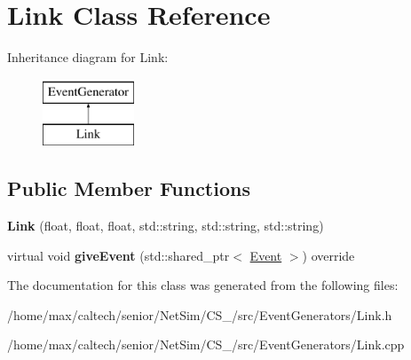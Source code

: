 \hypertarget{classLink}{\section{\-Link \-Class \-Reference}
\label{classLink}
}
\-Inheritance diagram for \-Link\-:\begin{figure}[H]
\begin{center}
\leavevmode
\includegraphics[height=2.000000cm]{classLink}
\end{center}
\end{figure}
\subsection*{\-Public \-Member \-Functions}
\begin{DoxyCompactItemize}
\item 
\hypertarget{classLink_af193bb2a442252ada227fcb2c16c627d}{{\bfseries \-Link} (float, float, float, std\-::string, std\-::string, std\-::string)}\label{classLink_af193bb2a442252ada227fcb2c16c627d}

\item 
\hypertarget{classLink_abd9466c4c2097329f4affd9b2eafbd7a}{virtual void {\bfseries give\-Event} (std\-::shared\-\_\-ptr$<$ \hyperlink{classEvent}{\-Event} $>$) override}\label{classLink_abd9466c4c2097329f4affd9b2eafbd7a}

\end{DoxyCompactItemize}


\-The documentation for this class was generated from the following files\-:\begin{DoxyCompactItemize}
\item 
/home/max/caltech/senior/\-Net\-Sim/\-C\-S\-\_/src/\-Event\-Generators/\-Link.\-h\item 
/home/max/caltech/senior/\-Net\-Sim/\-C\-S\-\_/src/\-Event\-Generators/\-Link.\-cpp\end{DoxyCompactItemize}
